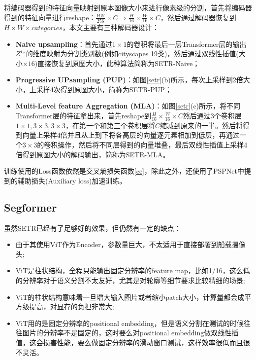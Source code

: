 \documentclass[cn,12pt,color=mine,scheme=chinese,bibstyle=gb7714-2015]{elegantbook}
\begin{document}
\begin{note}[解码器]
	将编码器得到的特征向量映射到原本图像大小来进行像素级的分割，首先将编码器得到的特征向量进行reshape：$\frac{HW}{256}\times C\Longrightarrow\frac{H}{16}\times\frac{W}{16}\times C$，然后通过解码器恢复到$H\times W\times categories$，本文主要有三种解码器设计：
	\begin{itemize}
		\item \textbf{Naive upsampling}：首先通过$1\times 1$的卷积将最后一层Transformer层的输出$Z^{L_e}$的维度映射为分割类别数(例如cityscapes 19类)，然后通过双线性插值(大小$\times 16$)直接恢复到原图大小，此种算法简称为SETR-Naive；
		\item \textbf{Progressive UPsampling (PUP)}：如图\ref{setr}(b)所示，每次上采样到2倍大小，上采样4次得到原图大小，简称为SETR-PUP；
		\item \textbf{Multi-Level feature Aggregation (MLA)}：如图\ref{setr}(c)所示，将不同Transformer层的特征拿出来，首先reshape到$\frac{H}{16}\times\frac{W}{16}\times C$然后通过3个卷积层$1\times1, 3\times3, 3\times3$，在第一个和第三个卷积层将$C$缩减到原来的一半。然后将得到向量上采样4倍并且从上到下将各高层的向量逐元素相加到低层，再通过一个$3\times3$的卷积操作，然后将不同层得到的向量堆叠，最后双线性插值上采样4倍得到原图大小的解码输出，简称为SETR-MLA。
	\end{itemize}
\end{note}

训练使用的Loss函数依然是交叉熵损失函数\eqref{ce}，除此之外，还使用了PSPNet\cite{zhao2017pyramid}中提到的辅助损失(Auxiliary loss)加速训练。

\subsection{Segformer}
虽然SETR已经有了足够好的效果，但仍然有一定的缺点：
\begin{itemize}
	\item 由于其使用ViT作为Encoder，参数量巨大，不太适用于直接部署到船载摄像头;
	\item ViT是柱状结构，全程只能输出固定分辨率的feature map，比如1/16，这么低的分辨率对于语义分割不太友好，尤其是对轮廓等细节要求比较精细的场景;
	\item ViT的柱状结构意味着一旦增大输入图片或者缩小patch大小，计算量都会成平方级提高，对显存的负担非常大;
	\item ViT用的是固定分辨率的positional embedding，但是语义分割在测试的时候往往图片的分辨率不是固定的，这时要么对positional embedding做双线性插值，这会损害性能，要么做固定分辨率的滑动窗口测试，这样效率很低而且很不灵活。
\end{itemize}
\end{document}
